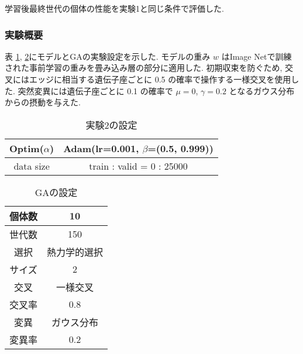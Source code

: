 学習後最終世代の個体の性能を実験1と同じ条件で評価した.


\changeindent{0cm}
\subsubsection{実験概要}
\label{sec:pred.02_03}
\changeindent{2cm}


表 \ref{tab:setting2}, \ref{tab:setting_ga}にモデルとGAの実験設定を示した.
モデルの重み $w$ はImage Netで訓練された事前学習の重みを畳み込み層の部分に適用した.
初期収束を防ぐため, 交叉にはエッジに相当する遺伝子座ごとに 0.5 の確率で操作する一様交叉を使用した.
突然変異には遺伝子座ごとに 0.1 の確率で $\mu=0$, $\gamma=0.2$ となるガウス分布からの摂動を与えた.


\begin{table}[t]
  \begin{center}
    \caption{実験2の設定}
  	\vspace{3mm}
    \begin{tabular}{|c|c|} \hline
      Optim($\alpha$) & Adam(lr=0.001, $\beta$=(0.5, 0.999)) \\ \hline
      data size & train : valid = 0 : 25000 \\ \hline
    \end{tabular}
    \label{tab:setting2}
  \end{center}
\end{table}

\begin{table}[t]
  \begin{center}
    \caption{GAの設定}
  	\vspace{3mm}
    \begin{tabular}{|c|c|} \hline
      個体数 & 10 \\ \hline
      世代数 & 150 \\ \hline \hline
      選択 & 熱力学的選択 \\ \hline
      サイズ & 2 \\ \hline \hline
      交叉 & 一様交叉 \\ \hline
      交叉率 & 0.8 \\ \hline \hline
      変異 & ガウス分布 \\ \hline
      変異率 & 0.2 \\ \hline
    \end{tabular}
    \label{tab:setting_ga}
  \end{center}
\end{table}
